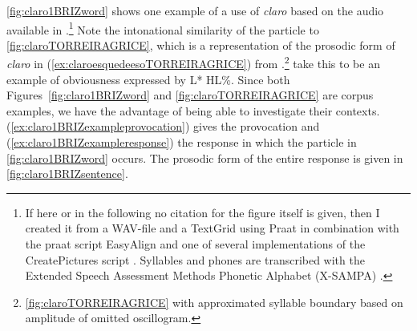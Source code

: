 \autoref{fig:claro1BRIZword} shows one example of a use of \textit{claro} based on the audio available in \citet{PonsBorderia.2011}.\footnote{If here or in the following no citation for the figure itself is given, then I created it from a WAV-file and a TextGrid using Praat \citep{BoersmaWeenink.praat} in combination with the praat script EasyAlign \citep{Goldman.2011} and one of several implementations of the CreatePictures script \citep{ElviraGarciaRoseano.2014createpictures}. Syllables and phones are transcribed with the Extended Speech Assessment Methods Phonetic Alphabet (X-SAMPA) \citep{Wells.1995}.} Note the intonational similarity of the particle to \autoref{fig:claroTORREIRAGRICE}, which is a representation of the prosodic form of \textit{claro} in (\ref{ex:claroesquedeesoTORREIRAGRICE}) from \citet[15]{TorreiraGrice.2018}.\footnote{\autoref{fig:claroTORREIRAGRICE} with approximated syllable boundary based on amplitude of omitted oscillogram.} \citet{TorreiraGrice.2018} take this to be an example of obviousness expressed by L* HL\%. Since both Figures~\ref{fig:claro1BRIZword} and \ref{fig:claroTORREIRAGRICE} are corpus examples, we have the advantage of being able to investigate their contexts. (\ref{ex:claro1BRIZexampleprovocation}) gives the provocation and (\ref{ex:claro1BRIZexampleresponse}) the response in which the particle in \autoref{fig:claro1BRIZword} occurs. The prosodic form of the entire response is given in \autoref{fig:claro1BRIZsentence}.


